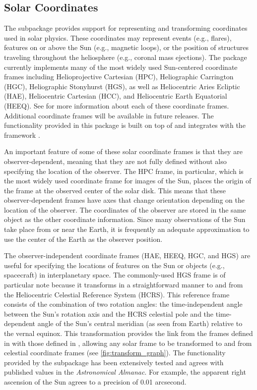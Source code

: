 \subsection{Solar Coordinates}
\label{sec:coords}

The  subpackage provides support for representing and transforming coordinates used in solar physics.
These coordinates may represent events (e.g., flares), features on or above the Sun (e.g., magnetic loops), or the position of structures traveling throughout the heliosphere (e.g., coronal mass ejections).
The package currently implements many of the most widely used Sun-centered coordinate frames including Helioprojective Cartesian (HPC), Heliographic Carrington (HGC), Heliographic Stonyhurst (HGS),  as well as Heliocentric Aries Ecliptic (HAE), Heliocentric Cartesian (HCC), and Heliocentric Earth Equatorial (HEEQ).
See \citet{2006A&A...449..791T} for more information about each of these coordinate frames.
Additional coordinate frames will be available in future releases.
The functionality provided in this package is built on top of and integrates with the  framework \citep[see Section 3.3 of][]{astropy2018}.

An important feature of some of these solar coordinate frames is that they are observer-dependent, meaning that they are not fully defined without also specifying the location of the observer.
The HPC frame, in particular, which is the most widely used coordinate frame for images of the Sun, places the origin of the frame at the observed center of the solar disk.
This means that these observer-dependent frames have axes that change orientation depending on the location of the observer.
The coordinates of the observer are stored in the same object as the other coordinate information.
Since many observations of the Sun take place from or near the Earth, it is frequently an adequate approximation to use the center of the Earth as the observer position.

The observer-independent coordinate frames (HAE, HEEQ, HGC, and HGS) are useful for specifying the locations of features on the Sun or objects (e.g., spacecraft) in interplanetary space.
The commonly-used HGS frame is of particular note because it transforms in a straightforward manner to and from the Heliocentric Celestial Reference System (HCRS).
This reference frame consists of the combination of two rotation angles: the time-independent angle between the Sun's rotation axis and the HCRS celestial pole \citep[see][]{2007CeMDA..98..155S} and the time-dependent angle of the Sun's central meridian (as seen from Earth) relative to the vernal equinox.
This transformation provides the link from the frames defined in  with those defined in , allowing any solar frame to be transformed to and from celestial coordinate frames (see \autoref{fig:transform_graph}).
The functionality provided by the  subpackage has been extensively tested and agrees with published values in the \textit{Astronomical Almanac}.
For example, the apparent right ascension of the Sun agrees to a precision of 0.01 arcsecond.

